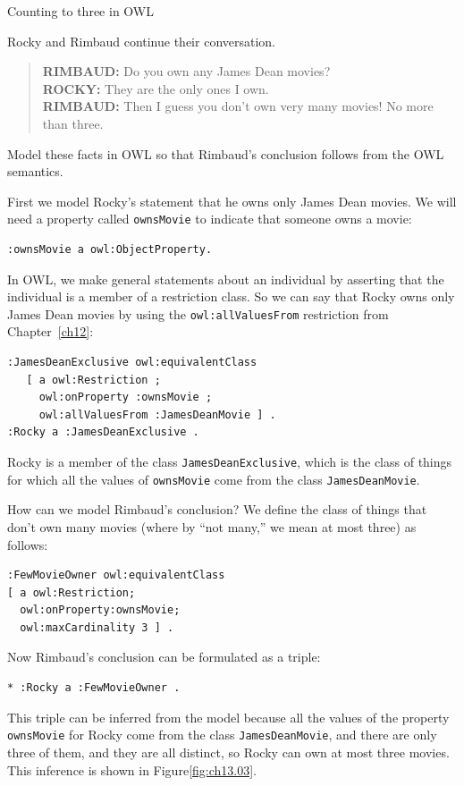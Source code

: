 \begin{challenge}{Counting to three in OWL}
\label{chal:count3}

Rocky and Rimbaud continue their conversation.

\begin{quote}
\textbf{RIMBAUD:} Do you own any James Dean movies? \\
\textbf{ROCKY:} They are the only ones I own. \\
\textbf{RIMBAUD:} Then I guess you don't own very many movies! No more than three.\\
\end{quote}

Model these facts in OWL so that Rimbaud's conclusion follows from the
OWL semantics.

\solution

First we model Rocky's statement that he owns only James Dean movies. We
will need a property called
\texttt{ownsMovie} to indicate that someone owns a movie:

\begin{lstlisting}
:ownsMovie a owl:ObjectProperty.
\end{lstlisting}

In OWL, we make general statements about an individual by asserting that
the individual is a member of a restriction class. So we can say that
Rocky owns only James Dean movies by using the \texttt{owl:allValuesFrom}
restriction from Chapter~\ref{ch12}:

\begin{lstlisting}
:JamesDeanExclusive owl:equivalentClass
   [ a owl:Restriction ;
     owl:onProperty :ownsMovie ;
     owl:allValuesFrom :JamesDeanMovie ] .
:Rocky a :JamesDeanExclusive .
\end{lstlisting}

Rocky is a member of the class \texttt{JamesDeanExclusive}, which is the class of
things for which all the values of \texttt{ownsMovie} come from the class
\texttt{JamesDeanMovie}.

How can we model Rimbaud's conclusion? We define the class of things
that don't own many movies (where by
``not many,'' we mean at most three) as follows:

\begin{lstlisting}
:FewMovieOwner owl:equivalentClass
[ a owl:Restriction; 
  owl:onProperty:ownsMovie;
  owl:maxCardinality 3 ] .
\end{lstlisting}

Now Rimbaud's conclusion can be formulated as a triple:

\begin{lstlisting}
* :Rocky a :FewMovieOwner .
\end{lstlisting}

This triple can be inferred from the model because all the values of the
property \texttt{ownsMovie} for Rocky come from the class \texttt{JamesDeanMovie}, and
there are only three of them, and they are all distinct, so Rocky can
own at most three movies. This inference is shown in Figure\ref{fig:ch13.03}.

\end{challenge}
